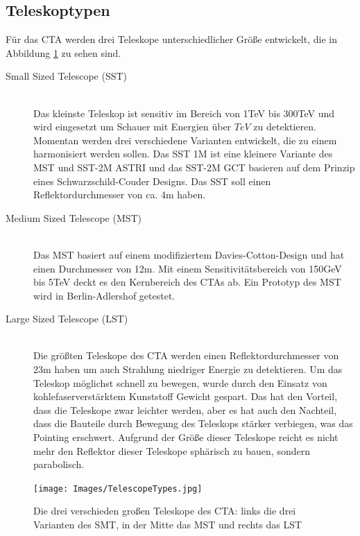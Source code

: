 \subsection{Teleskoptypen}
Für das CTA werden drei Teleskope unterschiedlicher Größe entwickelt, die in Abbildung \ref{img:TelescopeTypes} zu sehen sind.
\begin{description}
\item[Small Sized Telescope (SST)]\hfill \\
Das kleinste Teleskop ist sensitiv im Bereich von 1TeV bis 300TeV und wird eingesetzt um Schauer mit Energien über $\unit{TeV}$ zu detektieren. Momentan werden drei verschiedene Varianten entwickelt, die zu einem harmonisiert werden sollen. Das SST 1M ist eine kleinere Variante des MST und SST-2M  ASTRI und das SST-2M GCT basieren auf dem Prinzip eines Schwarzschild-Couder Designs. Das SST soll einen Reflektordurchmesser von ca. 4m haben.
\item[Medium Sized Telescope (MST)]\hfill \\ 
Das MST basiert auf einem modifiziertem Davies-Cotton-Design und hat einen Durchmesser von 12m. Mit einem Sensitivitätsbereich von 150GeV bis 5TeV deckt es den Kernbereich des CTAs ab. Ein Prototyp des MST wird in Berlin-Adlershof getestet.
\item[Large Sized Telescope (LST)]\hfill \\
Die größten Teleskope des CTA werden einen Reflektordurchmesser von 23m haben um auch Strahlung niedriger Energie zu detektieren. Um das Teleskop möglichst schnell zu bewegen, wurde durch den Einsatz von kohlefaserverstärktem Kunststoff Gewicht gespart. Das hat den Vorteil, dass die Teleskope zwar leichter werden, aber es hat auch den Nachteil, dass die Bauteile durch Bewegung des Teleskops stärker verbiegen, was das Pointing erschwert. Aufgrund der Größe dieser Teleskope reicht es nicht mehr den Reflektor dieser Teleskope sphärisch zu bauen, sondern parabolisch.%
\end{description}
\begin{figure}[htbp]
\centering
\texttt{[image: Images/TelescopeTypes.jpg]}
\caption{Die drei verschieden großen Teleskope des CTA: links die drei Varianten des SMT, in der Mitte das MST und rechts das LST}
\label{img:TelescopeTypes}
\end{figure}

